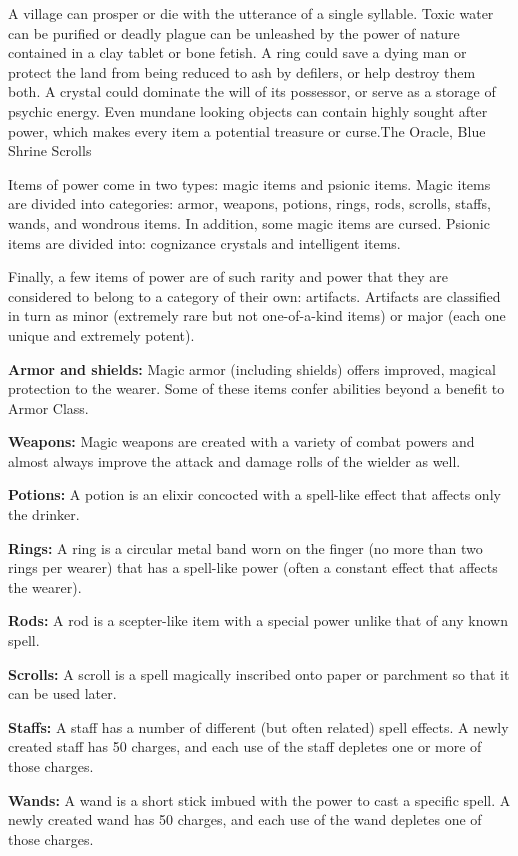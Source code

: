 {A village can prosper or die with the utterance of a single syllable. Toxic water can be purified or deadly plague can be unleashed by the power of nature contained in a clay tablet or bone fetish. A ring could save a dying man or protect the land from being reduced to ash by defilers, or help destroy them both. A crystal could dominate the will of its possessor, or serve as a storage of psychic energy. Even mundane looking objects can contain highly sought after power, which makes every item a potential treasure or curse.}{The Oracle, Blue Shrine Scrolls}

Items of power come in two types: magic items and psionic items. Magic items are divided into categories: armor, weapons, potions, rings, rods, scrolls, staffs, wands, and wondrous items. In addition, some magic items are cursed. Psionic items are divided into: cognizance crystals and intelligent items.

Finally, a few items of power are of such rarity and power that they are considered to belong to a category of their own: artifacts. Artifacts are classified in turn as minor (extremely rare but not one-of-a-kind items) or major (each one unique and extremely potent).

\textbf{Armor and shields:} Magic armor (including shields) offers improved, magical protection to the wearer. Some of these items confer abilities beyond a benefit to Armor Class.

\textbf{Weapons:} Magic weapons are created with a variety of combat powers and almost always improve the attack and damage rolls of the wielder as well.

\textbf{Potions:} A potion is an elixir concocted with a spell-like effect that affects only the drinker.

\textbf{Rings:} A ring is a circular metal band worn on the finger (no more than two rings per wearer) that has a spell-like power (often a constant effect that affects the wearer).

\textbf{Rods:} A rod is a scepter-like item with a special power unlike that of any known spell.

\textbf{Scrolls:} A scroll is a spell magically inscribed onto paper or parchment so that it can be used later.

\textbf{Staffs:} A staff has a number of different (but often related) spell effects. A newly created staff has 50 charges, and each use of the staff depletes one or more of those charges.

\textbf{Wands:} A wand is a short stick imbued with the power to cast a specific spell. A newly created wand has 50 charges, and each use of the wand depletes one of those charges.

